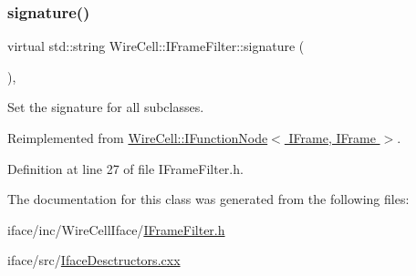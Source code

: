 \subsubsection{\texorpdfstring{signature()}{signature()}}
{\footnotesize\ttfamily virtual std\+::string Wire\+Cell\+::\+I\+Frame\+Filter\+::signature (\begin{DoxyParamCaption}{ }\end{DoxyParamCaption})\hspace{0.3cm}{\ttfamily [inline]}, {\ttfamily [virtual]}}



Set the signature for all subclasses. 



Reimplemented from \hyperlink{class_wire_cell_1_1_i_function_node_af59f46cf19ca9fdf4aade1f289feedf2}{Wire\+Cell\+::\+I\+Function\+Node$<$ I\+Frame, I\+Frame $>$}.



Definition at line 27 of file I\+Frame\+Filter.\+h.



The documentation for this class was generated from the following files\+:\begin{DoxyCompactItemize}
\item 
iface/inc/\+Wire\+Cell\+Iface/\hyperlink{_i_frame_filter_8h}{I\+Frame\+Filter.\+h}\item 
iface/src/\hyperlink{_iface_desctructors_8cxx}{Iface\+Desctructors.\+cxx}\end{DoxyCompactItemize}

